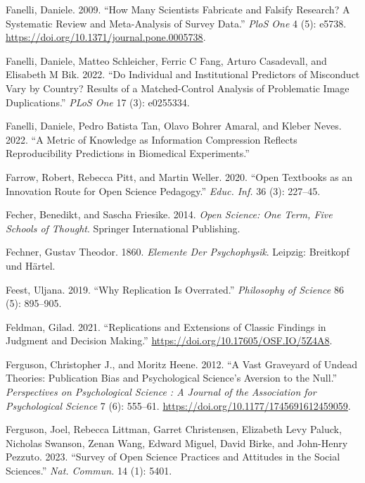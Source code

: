 \documentclass[
  letterpaper,
  DIV=11,
  numbers=noendperiod]{scrreprt}
\newlength{\cslhangindent}
\newenvironment{CSLReferences}[2] %
 {\begin{list}{}{%
  \setlength{\itemindent}{0pt}
  \setlength{\leftmargin}{0pt}
  \setlength{\parsep}{0pt}
  \ifodd #1
   \setlength{\leftmargin}{\cslhangindent}
   \setlength{\itemindent}{-1\cslhangindent}
  \fi
  \setlength{\itemsep}{#2\baselineskip}}}
 {\end{list}}
\begin{document}
\begin{CSLReferences}{1}{0}
Fanelli, Daniele. 2009. {``How Many Scientists Fabricate and Falsify
Research? A Systematic Review and Meta-Analysis of Survey Data.''}
\emph{PloS One} 4 (5): e5738.
\url{https://doi.org/10.1371/journal.pone.0005738}.

Fanelli, Daniele, Matteo Schleicher, Ferric C Fang, Arturo Casadevall,
and Elisabeth M Bik. 2022. {``Do Individual and Institutional Predictors
of Misconduct Vary by Country? Results of a Matched-Control Analysis of
Problematic Image Duplications.''} \emph{PLoS One} 17 (3): e0255334.

Fanelli, Daniele, Pedro Batista Tan, Olavo Bohrer Amaral, and Kleber
Neves. 2022. {``A Metric of Knowledge as Information Compression
Reflects Reproducibility Predictions in Biomedical Experiments.''}

Farrow, Robert, Rebecca Pitt, and Martin Weller. 2020. {``Open Textbooks
as an Innovation Route for Open Science Pedagogy.''} \emph{Educ. Inf.}
36 (3): 227--45.

Fecher, Benedikt, and Sascha Friesike. 2014. \emph{Open Science: One
Term, Five Schools of Thought}. Springer International Publishing.

Fechner, Gustav Theodor. 1860. \emph{Elemente Der Psychophysik}.
Leipzig: {Breitkopf und H{ä}rtel}.

Feest, Uljana. 2019. {``Why Replication Is Overrated.''}
\emph{Philosophy of Science} 86 (5): 895--905.

Feldman, Gilad. 2021. {``Replications and Extensions of Classic Findings
in Judgment and Decision Making.''}
\url{https://doi.org/10.17605/OSF.IO/5Z4A8}.

Ferguson, Christopher J., and Moritz Heene. 2012. {``A Vast Graveyard of
Undead Theories: Publication Bias and Psychological Science's Aversion
to the Null.''} \emph{Perspectives on Psychological Science : A Journal
of the Association for Psychological Science} 7 (6): 555--61.
\url{https://doi.org/10.1177/1745691612459059}.

Ferguson, Joel, Rebecca Littman, Garret Christensen, Elizabeth Levy
Paluck, Nicholas Swanson, Zenan Wang, Edward Miguel, David Birke, and
John-Henry Pezzuto. 2023. {``Survey of Open Science Practices and
Attitudes in the Social Sciences.''} \emph{Nat. Commun.} 14 (1): 5401.


\end{CSLReferences}
\end{document}
